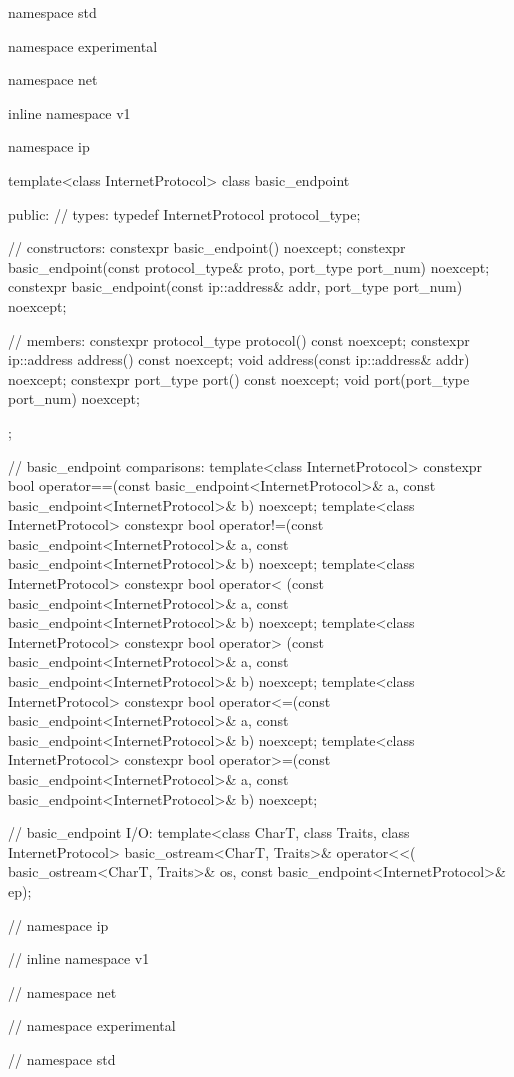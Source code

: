 \begin{codeblock}
namespace std {
namespace experimental {
namespace net {
inline namespace v1 {
namespace ip {

  template<class InternetProtocol>
  class basic_endpoint
  {
  public:
    // types:
    typedef InternetProtocol protocol_type;

    // constructors:
    constexpr basic_endpoint() noexcept;
    constexpr basic_endpoint(const protocol_type& proto,
                             port_type port_num) noexcept;
    constexpr basic_endpoint(const ip::address& addr,
                             port_type port_num) noexcept;

    // members:
    constexpr protocol_type protocol() const noexcept;
    constexpr ip::address address() const noexcept;
    void address(const ip::address& addr) noexcept;
    constexpr port_type port() const noexcept;
    void port(port_type port_num) noexcept;
  };

  // basic_endpoint comparisons:
  template<class InternetProtocol>
    constexpr bool operator==(const basic_endpoint<InternetProtocol>& a,
                              const basic_endpoint<InternetProtocol>& b) noexcept;
  template<class InternetProtocol>
    constexpr bool operator!=(const basic_endpoint<InternetProtocol>& a,
                              const basic_endpoint<InternetProtocol>& b) noexcept;
  template<class InternetProtocol>
    constexpr bool operator< (const basic_endpoint<InternetProtocol>& a,
                              const basic_endpoint<InternetProtocol>& b) noexcept;
  template<class InternetProtocol>
    constexpr bool operator> (const basic_endpoint<InternetProtocol>& a,
                              const basic_endpoint<InternetProtocol>& b) noexcept;
  template<class InternetProtocol>
    constexpr bool operator<=(const basic_endpoint<InternetProtocol>& a,
                              const basic_endpoint<InternetProtocol>& b) noexcept;
  template<class InternetProtocol>
    constexpr bool operator>=(const basic_endpoint<InternetProtocol>& a,
                              const basic_endpoint<InternetProtocol>& b) noexcept;

  // basic_endpoint I/O:
  template<class CharT, class Traits, class InternetProtocol>
    basic_ostream<CharT, Traits>& operator<<(
      basic_ostream<CharT, Traits>& os,
      const basic_endpoint<InternetProtocol>& ep);

} // namespace ip
} // inline namespace v1
} // namespace net
} // namespace experimental
} // namespace std
\end{codeblock}

